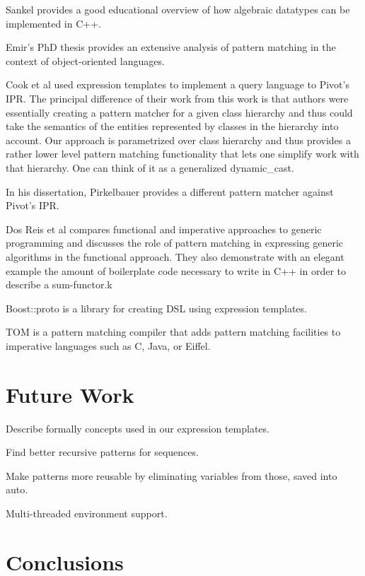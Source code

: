 \documentclass[preprint]{sigplanconf}
\begin{document}
Sankel provides a good educational overview of how algebraic datatypes can be 
implemented in C++\cite{SankelFP10,Sankel10}. 

Emir's PhD thesis provides an extensive analysis of pattern matching in the 
context of object-oriented languages\cite{EmirThesis}.

Cook et al used expression templates to implement a query language to Pivot's 
IPR\cite{iql04}. The principal difference of their work from this work is that 
authors were essentially creating a pattern matcher for a given class hierarchy 
and thus could take the semantics of the entities represented by classes in the 
hierarchy into account. Our approach is parametrized over class hierarchy and 
thus provides a rather lower level pattern matching functionality that lets one 
simplify work with that hierarchy.  One can think of it as a generalized 
dynamic\_cast.

In his dissertation, Pirkelbauer provides a different pattern matcher against 
Pivot's IPR\cite{PirkelbauerThesis}.

Dos Reis et al compares functional and imperative approaches to generic 
programming and discusses the role of pattern matching in expressing generic 
algorithms in the functional approach\cite{dos_reis:05:what_is_gp}. They also 
demonstrate with an elegant example the amount of boilerplate code necessary to 
write in C++ in order to describe a sum-functor.k

Boost::proto is a library for creating DSL using expression templates.

TOM is a pattern matching compiler that adds pattern matching facilities to 
imperative languages such as C, Java, or Eiffel.\cite{Moreau:2003}

\section{Future Work} %
\label{sec:fw}

Describe formally concepts used in our expression templates.

Find better recursive patterns for sequences.

Make patterns more reusable by eliminating variables from those, saved into 
auto.

Multi-threaded environment support.

\section{Conclusions} %
\label{sec:cc}
\end{document}
